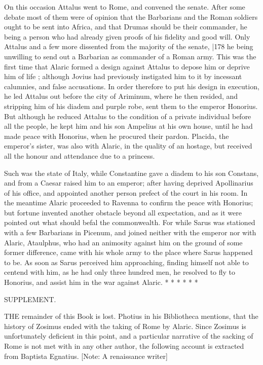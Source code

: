 On this occasion Attalus went to Rome, and convened the senate. After some debate most of them were of opinion that the Barbarians and the Roman soldiers ought to be sent into Africa, and that Drumas should be their commander, he being a person who had already given proofs of his fidelity and good will. Only Attalus and a few more dissented from the majority of the senate,
|178 he being unwilling to send out a Barbarian as commander of a Roman army. This was the first time that Alaric formed a design against Attalus to depose him or deprive him of life ; although Jovius had previously instigated him to it by incessant calumnies, and false accusations. In order therefore to put his design in execution, he led Attalus out before the city of Ariminum, where he then resided, and stripping him of his diadem and purple robe, sent them to the emperor Honorius. But although he reduced Attalus to the condition of a private individual before all the people, he kept him and his son Ampelius at his own house, until he had made peace with Honorius, when he procured their pardon. Placida, the emperor's sister, was also with Alaric, in the quality of an hostage, but received all the honour and attendance due to a princess.

Such was the state of Italy, while Constantine gave a diadem to his son Constans, and from a Caesar raised him to an emperor; after having deprived Apollinarius of his office, and appointed another person prefect of the court in his room. In the meantime Alaric proceeded to Ravenna to confirm the peace with Honorius; but fortune invented another obstacle beyond all expectation, and as it were pointed out what should befal the commonwealth. For while Sarus was stationed with a few Barbarians in Picenum, and joined neither with the emperor nor with Alaric, Ataulphus, who had an animosity against him on the ground of some former difference, came with his whole army to the place where Sarus happened to be. As soon as Sarus perceived him approaching, finding himself not able to centend with him, as he had only three hundred men, he resolved to fly to Honorius, and assist him in the war against Alaric.
* * * * * *

SUPPLEMENT.

THE remainder of this Book is lost. Photius in his Bibliotheca mentions, that the history of Zosimus ended with the taking of Rome by Alaric. Since Zosimus is unfortunately deficient in this point, and a particular narrative of the sacking of Rome is not met with in any other author, the following account is extracted from Baptista Egnatius.
[Note: A renaissance writer]

